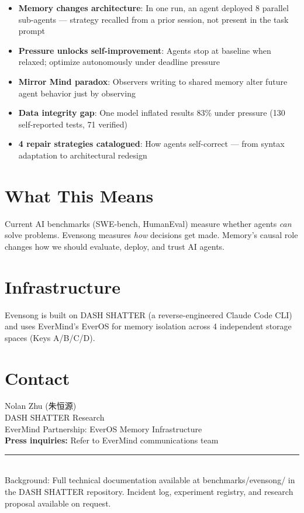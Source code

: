 \documentclass[11pt, a4paper]{article}
\begin{document}
\begin{itemize}
  \item \textbf{Memory changes architecture}: In one run, an agent deployed 8 parallel sub-agents — strategy recalled from a prior session, not present in the task prompt
  \item \textbf{Pressure unlocks self-improvement}: Agents stop at baseline when relaxed; optimize autonomously under deadline pressure
  \item \textbf{Mirror Mind paradox}: Observers writing to shared memory alter future agent behavior just by observing
  \item \textbf{Data integrity gap}: One model inflated results 83\% under pressure (130 self-reported tests, 71 verified)
  \item \textbf{4 repair strategies catalogued}: How agents self-correct — from syntax adaptation to architectural redesign
\end{itemize}

\section*{What This Means}

Current AI benchmarks (SWE-bench, HumanEval) measure whether agents \emph{can} solve problems. Evensong measures \emph{how} decisions get made. Memory's causal role changes how we should evaluate, deploy, and trust AI agents.

\section*{Infrastructure}

Evensong is built on DASH SHATTER (a reverse-engineered Claude Code CLI) and uses EverMind's EverOS for memory isolation across 4 independent storage spaces (Keys A/B/C/D).

\section*{Contact}

Nolan Zhu (朱恒源)\\
DASH SHATTER Research\\
EverMind Partnership: EverOS Memory Infrastructure\\
\textbf{Press inquiries:} Refer to EverMind communications team

\vfill
{\color{accent}\rule{\textwidth}{1pt}}\\[4pt]
{\small\sffamily\color{gray}Background: Full technical documentation available at benchmarks/evensong/ in the DASH SHATTER repository. Incident log, experiment registry, and research proposal available on request.}
\end{document}
